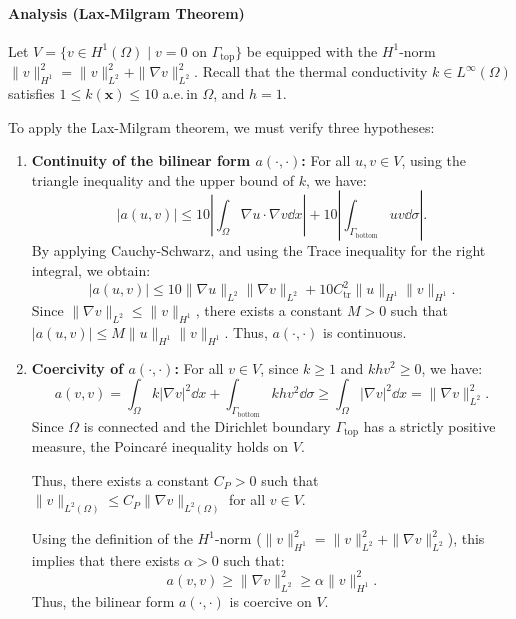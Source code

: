 \paragraph{Analysis (Lax-Milgram Theorem)}
Let $V = \{v \in H^1(\Omega) \mid v = 0 \text{ on } \Gamma_{\text{top}}\}$ be equipped with the $H^1$-norm $\|v\|_{H^1}^2 = \|v\|_{L^2}^2 + \|\nabla v\|_{L^2}^2$. Recall that the thermal conductivity $k \in L^\infty(\Omega)$ satisfies $1 \le k(\mathbf{x}) \le 10$ a.e.\,in $\Omega$, and $h = 1$.

To apply the Lax-Milgram theorem, we must verify three hypotheses:

\begin{enumerate}
  \item \textbf{Continuity of the bilinear form $a(\cdot, \cdot)$:}
  For all $u, v \in V$, using the triangle inequality and the upper bound of $k$, we have:
  \begin{equation*}
      |a(u,v)| \le 10 \displaystyle\left\lvert\int_\Omega \nabla u \cdot \nabla v \dd x \right \rvert + 10 \displaystyle\left\lvert\int_{\Gamma_{\text{bottom}}} uv \dd\sigma \right\rvert.
  \end{equation*}
  By applying Cauchy-Schwarz, and using the Trace inequality for the right integral, we obtain:
  \begin{equation*}
      |a(u,v)| \le 10 \|\nabla u\|_{L^2} \|\nabla v\|_{L^2} + 10 C_{\text{tr}}^2 \|u\|_{H^1} \|v\|_{H^1}.
  \end{equation*}
  Since $\|\nabla v\|_{L^2} \le \|v\|_{H^1}$, there exists a constant $M > 0$ such that $|a(u,v)| \le M \|u\|_{H^1} \|v\|_{H^1}$. Thus, $a(\cdot, \cdot)$ is continuous.

  \item \textbf{Coercivity of $a(\cdot, \cdot)$:}
  For all $v \in V$, since $k \ge 1$ and $k h v^2 \ge 0$, we have:
  \begin{equation*}
      a(v,v) = \int_\Omega k |\nabla v|^2 \dd x + \int_{\Gamma_{\text{bottom}}} k h v^2 \dd\sigma \ge \int_\Omega |\nabla v|^2 \dd x = \|\nabla v\|_{L^2}^2.
  \end{equation*}
  Since $\Omega$ is connected and the Dirichlet boundary $\Gamma_{\text{top}}$ has a strictly positive measure, the Poincaré inequality holds on $V$. 
  
  Thus, there exists a constant $C_P > 0$ such that $\|v\|_{L^2(\Omega)} \le C_P \|\nabla v\|_{L^2(\Omega)}$ for all $v \in V$.
  
  Using the definition of the $H^1$-norm ($\|v\|_{H^1}^2 = \|v\|_{L^2}^2 + \|\nabla v\|_{L^2}^2$), this implies that there exists $\alpha > 0$ such that:
  \begin{equation*}
      a(v,v) \ge \|\nabla v\|_{L^2}^2 \ge \alpha \|v\|_{H^1}^2.
  \end{equation*}
  Thus, the bilinear form $a(\cdot, \cdot)$ is coercive on $V$.


\end{enumerate}
